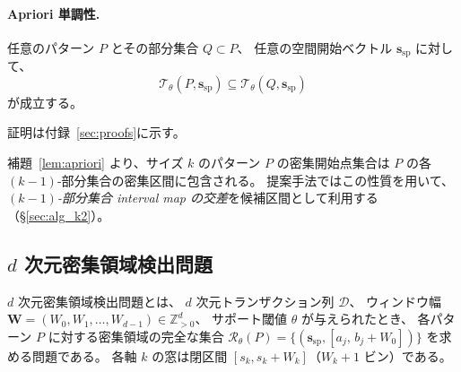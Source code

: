 \paragraph{Apriori 単調性.}

\begin{lemma}[密集開始点集合の単調性]\label{lem:apriori}
任意のパターン $P$ とその部分集合 $Q \subset P$、
任意の空間開始ベクトル $\bm{s}_{\mathrm{sp}}$ に対して、
\[
  \mathcal{T}_\theta(P,\bm{s}_{\mathrm{sp}})
  \subseteq
  \mathcal{T}_\theta(Q,\bm{s}_{\mathrm{sp}})
\]
が成立する。
\end{lemma}

証明は付録~\ref{sec:proofs}に示す。

補題~\ref{lem:apriori} より、サイズ $k$ のパターン $P$ の密集開始点集合は
$P$ の各 $(k{-}1)$-部分集合の密集区間に包含される。
提案手法ではこの性質を用いて、
\emph{$(k{-}1)$-部分集合 interval map の交差}を候補区間として利用する（\S\ref{sec:alg_k2}）。

\subsection{$d$ 次元密集領域検出問題}\label{sec:dense_detection}

$d$ 次元密集領域検出問題とは、
$d$ 次元トランザクション列 $\mathcal{D}$、
ウィンドウ幅
$\bm{W} = (W_0, W_1, \ldots, W_{d-1}) \in \mathbb{Z}_{>0}^d$、
サポート閾値 $\theta$ が与えられたとき、
各パターン $P$ に対する密集領域の完全な集合
$\mathcal{R}_\theta(P)
= \{(\bm{s}_{\mathrm{sp}}, [a_j,\, b_j + W_0])\}$
を求める問題である。
各軸 $k$ の窓は閉区間 $[s_k, s_k + W_k]$（$W_k + 1$ ビン）である。
